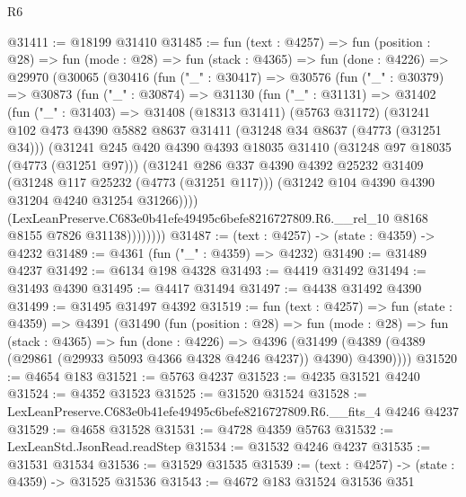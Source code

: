 \begin{lexlean}{R6}
\begin{coremodule}
@31411 := @18199 @31410
@31485 := fun (text : @4257) =>
  fun (position : @28) =>
  fun (mode : @28) =>
  fun (stack : @4365) =>
  fun (done : @4226) =>
  @29970
    (@30065
      (@30416
        (fun ("_" : @30417) =>
        @30576
          (fun ("_" : @30379) =>
          @30873
            (fun ("_" : @30874) =>
            @31130
              (fun ("_" : @31131) =>
              @31402
                (fun ("_" : @31403) =>
                @31408
                  (@18313 @31411)
                  (@5763 @31172)
                  (@31241
                    @102
                    @473
                    @4390
                    @5882
                    @8637
                    @31411
                    (@31248 @34 @8637 (@4773 (@31251 @34)))
                    (@31241
                      @245
                      @420
                      @4390
                      @4393
                      @18035
                      @31410
                      (@31248 @97 @18035 (@4773 (@31251 @97)))
                      (@31241
                        @286
                        @337
                        @4390
                        @4392
                        @25232
                        @31409
                        (@31248 @117 @25232 (@4773 (@31251 @117)))
                        (@31242 @104 @4390 @4390 @31204 @4240 @31254 @31266))))
                  (LexLeanPreserve.C683e0b41efe49495c6befe8216727809.R6.__rel_10
                    @8168
                    @8155
                    @7826
                    @31138))))))))
@31487 := (text : @4257) -> (state : @4359) -> @4232
@31489 := @4361 (fun ("_" : @4359) => @4232)
@31490 := @31489 @4237
@31492 := @6134 @198 @4328
@31493 := @4419 @31492
@31494 := @31493 @4390
@31495 := @4417 @31494
@31497 := @4438 @31492 @4390
@31499 := @31495 @31497 @4392
@31519 := fun (text : @4257) =>
  fun (state : @4359) =>
  @4391
    (@31490
      (fun (position : @28) =>
      fun (mode : @28) =>
      fun (stack : @4365) =>
      fun (done : @4226) =>
      @4396 (@31499 (@4389 (@4389 (@29861 (@29933 @5093 @4366 @4328 @4246 @4237)) @4390) @4390))))
@31520 := @4654 @183
@31521 := @5763 @4237
@31523 := @4235 @31521 @4240
@31524 := @4352 @31523
@31525 := @31520 @31524
@31528 := LexLeanPreserve.C683e0b41efe49495c6befe8216727809.R6.__fits_4 @4246 @4237
@31529 := @4658 @31528
@31531 := @4728 @4359 @5763
@31532 := LexLeanStd.JsonRead.readStep
@31534 := @31532 @4246 @4237
@31535 := @31531 @31534
@31536 := @31529 @31535
@31539 := (text : @4257) -> (state : @4359) -> @31525 @31536
@31543 := @4672 @183 @31524 @31536 @351

\end{coremodule}
\end{lexlean}
